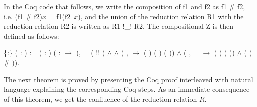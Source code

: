 \documentclass[a4paper]{article}
\begin{document}
In the Coq code that follows, we write the composition of f1 and f2 as
f1 \# f2, i.e. (f1 \# f2)$x$ = f1(f2\ $x$), and the union of the
reduction relation R1 with the reduction relation R2 is written as R1
!\_! R2. The compositional Z is then defined as follows:

\begin{coqdoccode}
  \coqdocemptyline \coqdocnoindent {}
   \{:\} (
  : ) := \coqdoctac{\ensuremath{\exists}}
  ( :  )
  ( : 
  \ensuremath{\rightarrow} ),  =
  ( !\coqdocvar{\_}! ) \ensuremath{\land}
    
  \ensuremath{\land} (\coqdockw{\ensuremath{\forall}} 
  ,   
  \ensuremath{\rightarrow} ( )
  ( ) ( ))
  \ensuremath{\land} (\coqdockw{\ensuremath{\forall}} 
  ,  =  
  \ensuremath{\rightarrow} ( )
   ( )) \ensuremath{\land}
  (  
  ( \# )).\coqdoceol \coqdocemptyline
  \coqdocemptyline
\end{coqdoccode}

The next theorem is proved by presenting the Coq proof interleaved with natural language explaining the corresponding Coq steps. As an immediate consequence of this theorem, we get the confluence of the reduction relation $R$.
\end{document}
